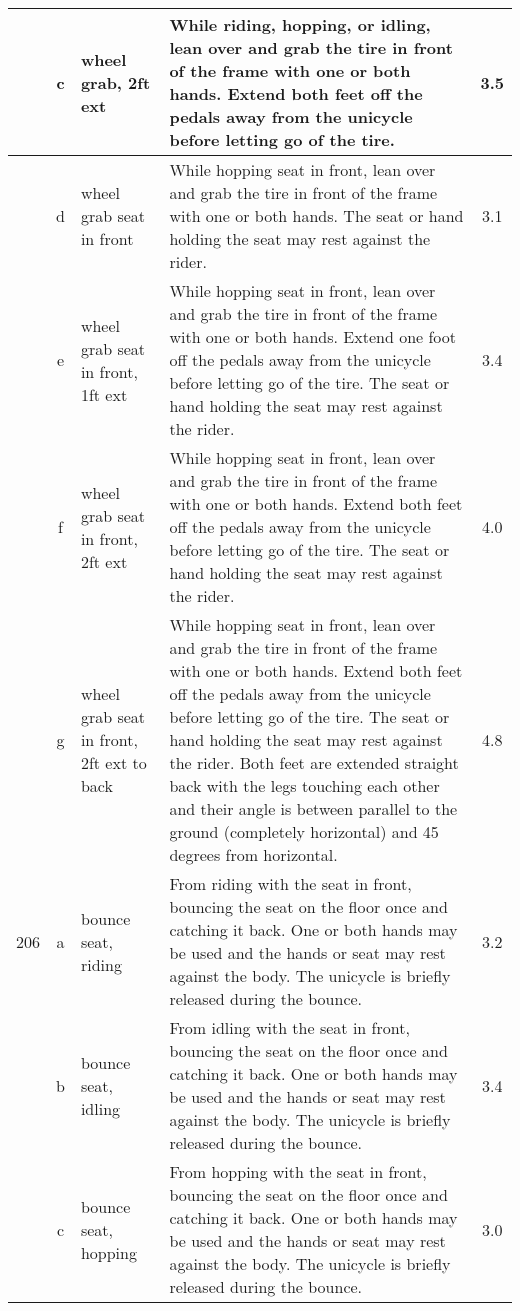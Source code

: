 \begin{longtable}{|r|c|p{4cm}|p{8cm}|c|}
\hline
  & c & wheel grab, 2ft ext & While riding, hopping, or idling, lean over and grab the tire in front of the frame with one or both hands. Extend both feet off the pedals away from the unicycle before letting go of the tire. & 3.5 \\ 
\hline
  & d & wheel grab seat in front  & While hopping seat in front, lean over and grab the tire in front of the frame with one or both hands. The seat or hand holding the seat may rest against the rider.  & 3.1 \\ 
\hline
  & e & wheel grab seat in front, 1ft ext & While hopping seat in front, lean over and grab the tire in front of the frame with one or both hands. Extend one foot off the pedals away from the unicycle before letting go of the tire. The seat or hand holding the seat may rest against the rider. & 3.4 \\ 
\hline
  & f & wheel grab seat in front, 2ft ext & While hopping seat in front, lean over and grab the tire in front of the frame with one or both hands. Extend both feet off the pedals away from the unicycle before letting go of the tire. The seat or hand holding the seat may rest against the rider.  & 4.0 \\ 
\hline
  & g & wheel grab seat in front, 2ft ext to back & While hopping seat in front, lean over and grab the tire in front of the frame with one or both hands. Extend both feet off the pedals away from the unicycle before letting go of the tire. The seat or hand holding the seat may rest against the rider. Both feet are extended straight back with the legs touching each other and their angle is between parallel to the ground (completely horizontal) and 45 degrees from horizontal. & 4.8 \\ 
\hline
206 & a & bounce seat, riding & From riding with the seat in front, bouncing the seat on the floor once and catching it back. One or both hands may be used and the hands or seat may rest against the body. The unicycle is briefly released during the bounce.  & 3.2 \\ 
\hline
  & b & bounce seat, idling & From idling with the seat in front, bouncing the seat on the floor once and catching it back. One or both hands may be used and the hands or seat may rest against the body. The unicycle is briefly released during the bounce.  & 3.4 \\ 
\hline
  & c & bounce seat, hopping  & From hopping with the seat in front, bouncing the seat on the floor once and catching it back. One or both hands may be used and the hands or seat may rest against the body. The unicycle is briefly released during the bounce. & 3.0 \\ 

\end{longtable}
